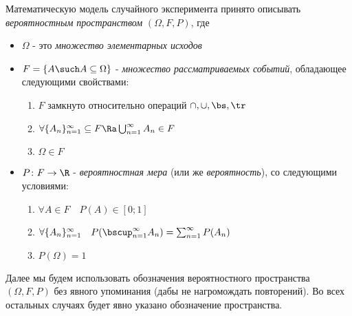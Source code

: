 \begin{definition}
	Математическую модель случайного эксперимента принято описывать \textit{вероятностным пространством} $(\Omega, F, P)$, где
	\begin{itemize}
		\item $\Omega$ - это \textit{множество элементарных исходов}
		
		\item $F = \{A \such A \subseteq \Omega\}$ - \textit{множество рассматриваемых событий}, обладающее следующими свойствами:
		\begin{enumerate}
			\item $F$ замкнуто относительно операций $\cap, \cup, \bs, \tr$
			
			\item $\forall \{A_n\}_{n = 1}^\infty \subseteq F \Ra \bigcup_{n = 1}^\infty A_n \in F$
			
			\item $\Omega \in F$
		\end{enumerate}
		
		\item $P \colon F \to \R$ - \textit{вероятностная мера} (или же \textit{вероятность}), со следующими условиями:
		\begin{enumerate}
			\item $\forall A \in F \quad P(A) \in [0; 1]$
			
			\item $\forall \{A_n\}_{n = 1}^\infty \quad P(\bscup_{n = 1}^\infty A_n) = \sum_{n = 1}^\infty P(A_n)$
			
			\item $P(\Omega) = 1$
		\end{enumerate}
	\end{itemize}
\end{definition}

\begin{note}
	Далее мы будем использовать обозначения вероятностного пространства $(\Omega, F, P)$ без явного упоминания (дабы не нагромождать повторений). Во всех остальных случаях будет явно указано обозначение пространства.
\end{note}